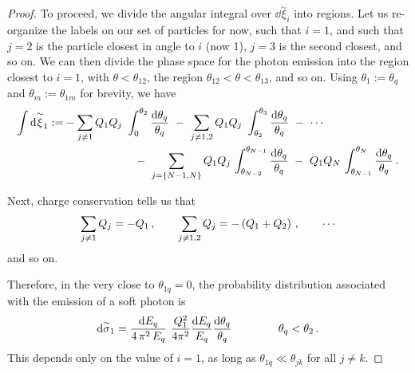 \begin{proof}
   To proceed, we divide the angular integral over \(\dd\overset{\sim}{\xi}_i\) into regions.
    Let us re-organize the labels on our set of particles for now, such that \(i = 1\), and such that \(j=2\) is the particle closest in angle to \(i\) (now 1), \(j=3\) is the second closest, and so on.
    We can then divide the phase space for the photon emission into the region closest to \(i=1\), with \(\theta < \theta_{12}\), the region \(\theta_{12} < \theta < \theta_{13}\), and so on.
    Using \(\theta_1 := \theta_q\) and \(\theta_m := \theta_{1m}\) for brevity, we have
    \begin{align}
        \label{eq:qed-angular-phase-space-cones}
        \int
       \dd\overset{\sim}{\xi}_1
       :=&
       -
       \sum_{j \neq 1}
       Q_1 Q_j
       \,\,
       \int_0^{\theta_{2}} \frac{\dd\theta_{q}}{\theta_{q}}
       \,\,
       -
       \,\,
       \sum_{j \neq 1,2}
       Q_1 Q_j
       \,\,
       \int_{\theta_{2}}^{\theta_{3}} \frac{\dd\theta_{q}}{\theta_{q}}
       \,\,
       -
       \,\,
       \cdots
       \\
       &\qquad\qquad\qquad
       \notag
       \,\,
       -
       \,\,
       \sum_{j = \{N-1, N\}}
       Q_1 Q_j
       \,
       \int_{\theta_{N-2}}^{\theta_{N-1}} \frac{\dd\theta_{q}}{\theta_{q}}
       \,\,
       -
       \,\,
       Q_1 Q_N
       \,
       \int_{\theta_{N-1}}^{\theta_{N}} \frac{\dd\theta_{q}}{\theta_{q}}
       \,.
    \end{align}

    Next, charge conservation tells us that
    \begin{align}
        \label{eq:qed-charge-conservation}
        \sum_{j \neq 1} Q_j
        =
        -Q_1
        \,,
        \qquad
        \sum_{j \neq 1,2} Q_j
        =
        -\le(Q_1+Q_2\ri)
        \,,
        \qquad
        \cdots
    \end{align}
    and so on.

    Therefore, in the  very close to \(\theta_{1q} = 0\), the probability distribution associated with the emission of a soft photon is
    \begin{align}
        \dd\overset{\sim}{\sigma}_1
        =
        \frac{\dd E_q}{4\,\pi^2\, E_q}
        \,\,
        \frac{Q_1^2}{4\pi^2}
        \frac{\dd E_q}{E_q}
        \frac{\dd\theta_q}{\theta_{q}}
        \,
        \qquad\qquad
        \theta_q < \theta_2
        \,.
    \end{align}
    This depends only on the value of \(i=1\), as long as \(\theta_{1q} \ll \theta_{jk}\) for all \(j \neq k\).


\end{proof}
